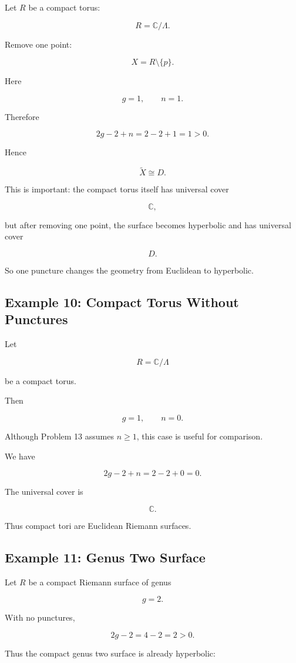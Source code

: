 \documentclass[12pt,a4paper]{article}
\theoremstyle{notespace}
\begin{document}
Let \(R\) be a compact torus:

\[
R=\mathbb C/\Lambda.
\]

Remove one point:

\[
X=R\setminus\{p\}.
\]

Here

\[
g=1,
\qquad
n=1.
\]

Therefore

\[
2g-2+n
=
2-2+1
=
1>0.
\]

Hence

\[
\widetilde X
\cong
D.
\]

This is important: the compact torus itself has universal cover

\[
\mathbb C,
\]

but after removing one point, the surface becomes hyperbolic and has universal cover

\[
D.
\]

So one puncture changes the geometry from Euclidean to hyperbolic.

\subsection{Example 10: Compact Torus Without Punctures}

Let

\[
R=\mathbb C/\Lambda
\]

be a compact torus.

Then

\[
g=1,
\qquad
n=0.
\]

Although Problem 13 assumes \(n\ge1\), this case is useful for comparison.

We have

\[
2g-2+n
=
2-2+0
=
0.
\]

The universal cover is

\[
\mathbb C.
\]

Thus compact tori are Euclidean Riemann surfaces.

\subsection{Example 11: Genus Two Surface}

Let \(R\) be a compact Riemann surface of genus

\[
g=2.
\]

With no punctures,

\[
2g-2
=
4-2
=
2>0.
\]

Thus the compact genus two surface is already hyperbolic:
\end{document}
